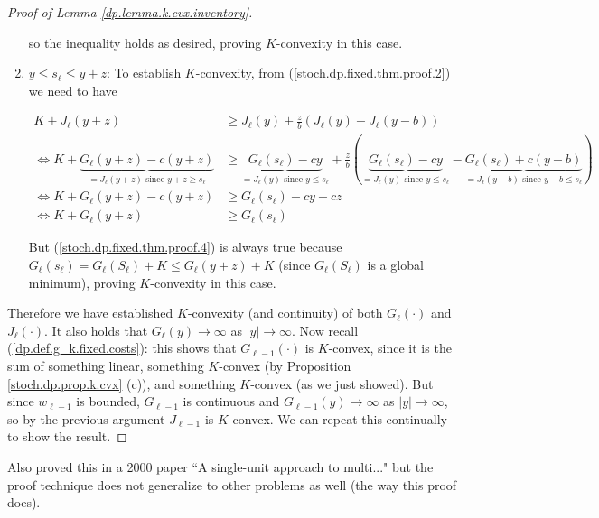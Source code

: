\begin{proof}[Proof of Lemma \ref{dp.lemma.k.cvx.inventory}]
\begin{enumerate}
so the inequality holds as desired, proving \(K\)-convexity in this case.

\item \(y \leq s_\ell \leq y + z\): To establish \(K\)-convexity, from (\ref{stoch.dp.fixed.thm.proof.2}) we need to have

\begin{align}
K + J_\ell(y+z) & \geq J_\ell(y) + \frac{z}{b} \left( J_\ell(y) - J_\ell(y-b)\right) \nonumber \\
\iff K+ \underbrace{G_\ell(y+z) - c(y+ z)}_{=J_\ell(y+z) \text{ since } y + z \geq s_\ell }  & \geq \underbrace{G_\ell(s_\ell) - cy}_{=J_\ell(y) \text{ since } y  \leq s_\ell }  + \frac{z}{b} \left( \underbrace{G_\ell(s_\ell) - cy}_{=J_\ell(y) \text{ since } y  \leq s_\ell }  - \underbrace{G_\ell(s_\ell) + c(y-b)}_{=J_\ell(y-b) \text{ since } y -b \leq s_\ell } \right) \nonumber \\
\iff K+ G_\ell(y+z) - c(y+ z) & \geq G_\ell(s_\ell) - cy -c z \nonumber \\
\iff K+ G_\ell(y+z) & \geq G_\ell(s_\ell) \label{stoch.dp.fixed.thm.proof.4}
\end{align} 

But (\ref{stoch.dp.fixed.thm.proof.4}) is always true because \(G_\ell(s_\ell) = G_\ell(S_\ell) + K \leq G_\ell(y+z) + K\) (since \(G_\ell(S_\ell)\) is a global minimum), proving \(K\)-convexity in this case.

\end{enumerate}

Therefore we have established \(K\)-convexity (and continuity) of both \(G_\ell(\cdot)\) and \(J_\ell(\cdot)\). It also holds that \(G_\ell(y) \to \infty \) as \(|y| \to \infty\). Now recall (\ref{dp.def.g_k.fixed.costs}): this shows that \(G_{\ell-1}(\cdot)\) is \(K\)-convex, since it is the sum of something linear, something \(K\)-convex (by Proposition \ref{stoch.dp.prop.k.cvx} (c)), and something \(K\)-convex (as we just showed). But since \(w_{\ell-1}\) is bounded, \(G_{\ell-1}\) is continuous and \(G_{\ell - 1}(y) \to \infty\) as \(|y| \to \infty\), so by the previous argument \(J_{\ell-1}\) is \(K\)-convex. We can repeat this continually to show the result.





\end{proof}

\begin{remark}

Also proved this in a 2000 paper ``A single-unit approach to multi..." but the proof technique does not generalize to other problems as well (the way this proof does).

\end{remark}


